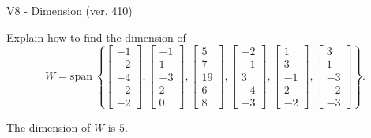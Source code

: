 \begin{exercise}
  \begin{exerciseTitle}V8 - Dimension (ver. 410)\end{exerciseTitle}
  \begin{exerciseStatement}
    Explain how to find the dimension of 
\[W=\mathrm{span}\ \left\{\left[\begin{array}{r}
-1 \\
-2 \\
-4 \\
-2 \\
-2
\end{array}\right] , \left[\begin{array}{r}
-1 \\
1 \\
-3 \\
2 \\
0
\end{array}\right] , \left[\begin{array}{r}
5 \\
7 \\
19 \\
6 \\
8
\end{array}\right] , \left[\begin{array}{r}
-2 \\
-1 \\
3 \\
-4 \\
-3
\end{array}\right] , \left[\begin{array}{r}
1 \\
3 \\
-1 \\
2 \\
-2
\end{array}\right] , \left[\begin{array}{r}
3 \\
1 \\
-3 \\
-2 \\
-3
\end{array}\right]\right\}.\]



  \end{exerciseStatement}
  \begin{exerciseAnswer}
   The dimension of \(W\) is  \(5\).
  


  \end{exerciseAnswer}
\end{exercise}